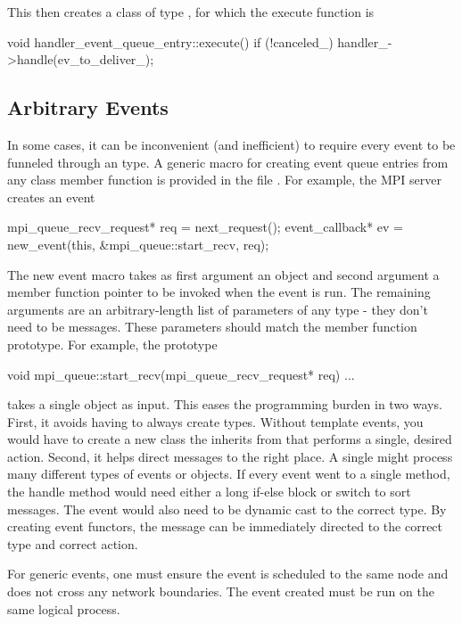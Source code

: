 This then creates a class of type , for which the execute function is

\begin{CppCode}
void
handler_event_queue_entry::execute()
{
  if (!canceled_) {
    handler_->handle(ev_to_deliver_);
  }
}
\end{CppCode}

\subsection{Arbitrary Events}
In some cases, it can be inconvenient (and inefficient) to require every event to be funneled through an \evhandler type.
A generic macro for creating event queue entries from any class member function is provided in the file .
For example, the MPI server creates an event

\begin{CppCode}
mpi_queue_recv_request* req = next_request();
event_callback* ev = new_event(this, &mpi_queue::start_recv, req);
\end{CppCode}
The new event macro takes as first argument an object and second argument a member function pointer to be invoked when the event is run.
The remaining arguments are an arbitrary-length list of parameters of any type - they don't need to be messages. 
These parameters should match the member function prototype. 
For example, the prototype

\begin{CppCode}
void
mpi_queue::start_recv(mpi_queue_recv_request* req)
{
  ...
}
\end{CppCode}
takes a single  object as input.
This eases the programming burden in two ways.
First, it avoids having to always create \evhandler types.
Without template events, you would have to create a new class the inherits from \evhandler that performs a single, desired action.
Second, it helps direct messages to the right place.  A single \evhandler might process many different types of events or objects.
If every event went to a single  method, the handle method would need either a long if-else block or switch to sort messages.
The event would also need to be dynamic cast to the correct type.
By creating event functors, the message can be immediately directed to the correct type and correct action.

For generic events, one must ensure the event is scheduled to the same node and does not cross any network boundaries.
The event created must be run on the same logical process.

